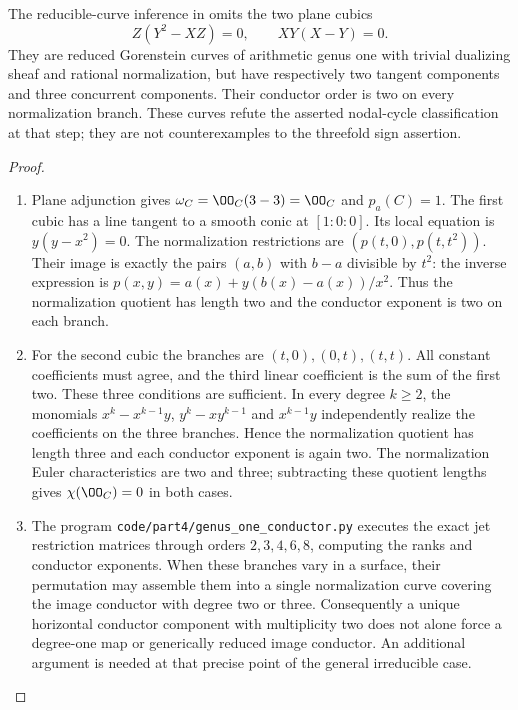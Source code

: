 \begin{proposition}[P4.14]\hypertarget{tag-02WL}{}\label{night:P4.14}\label{stmt:P4.14}

The reducible-curve inference in \cite[proof of Proposition~7.3,
p.~16 of the attached-source edition]{CDP20} omits the two plane cubics
\[
 Z(Y^2-XZ)=0,\qquad XY(X-Y)=0.
\]
They are reduced Gorenstein curves of arithmetic genus one with
trivial dualizing sheaf and rational normalization, but have
respectively two tangent components and three concurrent
components. Their conductor order is two on every normalization
branch. These curves refute the asserted nodal-cycle
classification at that step; they are not counterexamples to
the threefold sign assertion.
\end{proposition}
\begin{proof}

\begin{enumerate}[label={$\langle1\rangle$\arabic*.},leftmargin=*]
\item Plane adjunction gives $\omega_C=\OO_C(3-3)=\OO_C$ and
$p_a(C)=1$. The first cubic has a line tangent to a smooth
conic at $[1:0:0]$. Its local equation is $y(y-x^2)=0$.
The normalization restrictions are $(p(t,0),p(t,t^2))$.
Their image is exactly the pairs $(a,b)$ with $b-a$ divisible
by $t^2$: the inverse expression is
$p(x,y)=a(x)+y(b(x)-a(x))/x^2$. Thus the normalization
quotient has length two and the conductor exponent is two on
each branch.

\item For the second cubic the branches are $(t,0),(0,t),(t,t)$.
All constant coefficients must agree, and the third linear
coefficient is the sum of the first two. These three conditions
are sufficient. In every degree $k\ge2$, the monomials
$x^k-x^{k-1}y$, $y^k-xy^{k-1}$ and $x^{k-1}y$ independently
realize the coefficients on the three branches. Hence the
normalization quotient has length three and each conductor
exponent is again two. The normalization Euler characteristics
are two and three; subtracting these quotient lengths gives
$\chi(\OO_C)=0$ in both cases.

\item The program \texttt{code/part4/genus\_one\_conductor.py}
executes the exact jet restriction matrices through orders
$2,3,4,6,8$, computing the ranks and conductor exponents.
When these branches vary in a surface, their permutation may
assemble them into a single normalization curve covering the
image conductor with degree two or three. Consequently a
unique horizontal conductor component with multiplicity two
does not alone force a degree-one map or generically reduced
image conductor. An additional argument is needed at that
precise point of the general irreducible case.

\end{enumerate}
\end{proof}
